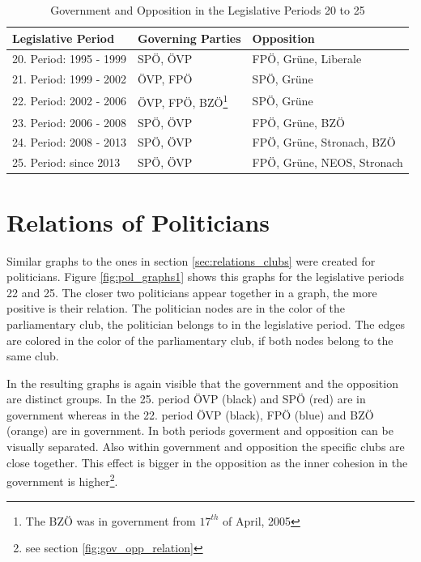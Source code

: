 \begin{table}

\centering
\bgroup
\def\arraystretch{1.2}
\begin{tabular}{| p{4cm} | p{3cm} | l |}
\hline
  Legislative Period & Governing Parties & Opposition  \\
\hline
\hline
  20. Period: 1995 - 1999 & SPÖ, ÖVP & FPÖ, Grüne, Liberale \\
\hline
  21. Period: 1999 - 2002 & ÖVP, FPÖ & SPÖ, Grüne \\
\hline
  22. Period: 2002 - 2006 & ÖVP, FPÖ, BZÖ\footnote{The BZÖ was in government from $17^{th}$ of April, 2005} & SPÖ, Grüne \\
\hline
  23. Period: 2006 - 2008 & SPÖ, ÖVP & FPÖ, Grüne, BZÖ \\
\hline
  24. Period: 2008 - 2013 & SPÖ, ÖVP & FPÖ, Grüne, Stronach, BZÖ \\
\hline
  25. Period: since 2013 & SPÖ, ÖVP & FPÖ, Grüne, NEOS, Stronach \\
\hline

\end{tabular}
\egroup
\caption{Government and Opposition in the Legislative Periods 20 to 25}
\label{table:gov_opp_parties}
\end{table}


\section{Relations of Politicians}
\label{sec:relations_pol}
Similar graphs to the ones in section \ref{sec:relations_clubs} were created for politicians. Figure \ref{fig:pol_graphs1} shows this graphs for the legislative periods 22 and 25. The closer two politicians appear together in a graph, the more positive is their relation. The politician nodes are in the color of the parliamentary club, the politician belongs to in the legislative period. The edges are colored in the color of the parliamentary club, if both nodes belong to the same club.

In the resulting graphs is again visible that the government and the opposition are distinct groups. In the 25. period ÖVP (black) and SPÖ (red) are in government whereas in the 22. period ÖVP (black), FPÖ (blue) and BZÖ (orange) are in government. In both periods goverment and opposition can be visually separated. Also within government and opposition the specific clubs are close together. This effect is bigger in the opposition as the inner cohesion in the government is higher\footnote{see section \ref{fig:gov_opp_relation}}.

